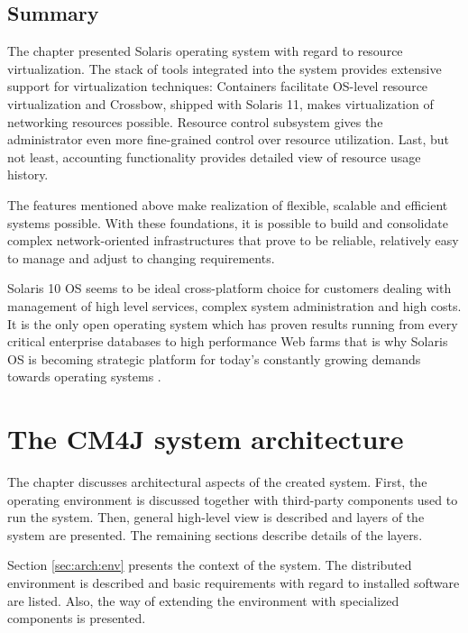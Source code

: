 \documentclass[11pt]{book}
\begin{document}
                

    \section*{Summary}

      The chapter presented Solaris operating system with regard to resource virtualization. The stack of tools
      integrated into the system provides extensive support for virtualization techniques: Containers facilitate
      OS-level resource virtualization and Crossbow, shipped with Solaris 11, makes virtualization of networking
      resources possible. Resource control subsystem gives the administrator even more fine-grained control over
      resource utilization. Last, but not least, accounting functionality provides detailed view of resource usage
      history.

      The features mentioned above make realization of flexible, scalable and efficient systems possible. With these
      foundations, it is possible to build and consolidate complex network-oriented infrastructures that prove to be
      reliable, relatively easy to manage and adjust to changing requirements.

      Solaris 10 OS seems to be ideal cross-platform choice for customers dealing with management of high level
      services, complex system administration and high costs. It is the only open operating system which has proven
      results running from every critical enterprise databases to high performance Web farms that is why Solaris OS is
      becoming strategic platform for today's constantly growing demands towards operating systems
      \cite{solaris_operating_system}. 


  \chapter{The CM4J system architecture}
  \label{chap:arch}

    The chapter discusses architectural aspects of the created system. First, the operating environment is discussed
    together with third-party components used to run the system. Then, general high-level view is described and
    layers of the system are presented. The remaining sections describe details of the layers.

    Section \ref{sec:arch:env} presents the context of the system. The distributed environment is described and
    basic requirements with regard to installed software are listed. Also, the way of extending the environment with
    specialized components is presented.
\end{document}
